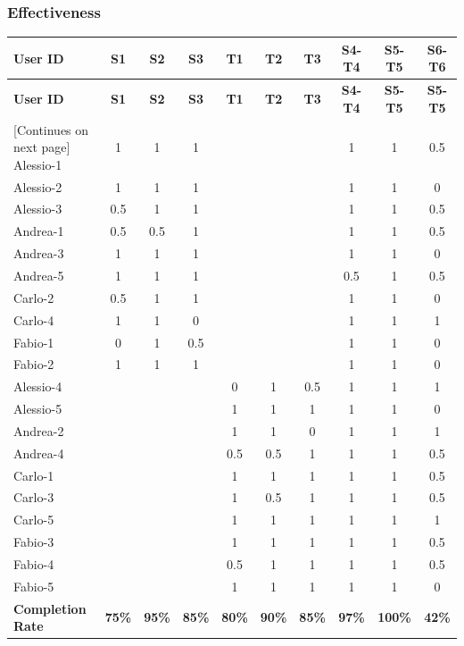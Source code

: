\subsubsection{Effectiveness}
    \begin{tabularx}{\linewidth}{l|c|c|c|c|c|c|c|c|c}
    \toprule
    \textbf{User ID} & \textbf{S1} & \textbf{S2} & \textbf{S3} & \textbf{T1} & \textbf{T2} & \textbf{T3} & \textbf{S4-T4} & \textbf{S5-T5} & \textbf{S6-T6} \\
    \midrule
    \endfirsthead
    \toprule
    \textbf{User ID} & \textbf{S1} & \textbf{S2} & \textbf{S3} & \textbf{T1} & \textbf{T2} & \textbf{T3} & \textbf{S4-T4} & \textbf{S5-T5} & \textbf{S5-T5} \\
    \midrule
    \endhead
    \midrule
    \footnotesize [Continues on next page]
    \endfoot
    \bottomrule
    \endlastfoot
        Alessio-1 & 1 & 1 & 1 &  &  &  & 1 & 1 & 0.5 \\ \midrule
        Alessio-2 & 1 & 1 & 1 &  &  &  & 1 & 1 & 0 \\ \midrule
        Alessio-3 & 0.5 & 1 & 1 &  &  &  & 1 & 1 & 0.5 \\ \midrule
        Andrea-1 & 0.5 & 0.5 & 1 &  &  &  & 1 & 1 & 0.5 \\ \midrule
        Andrea-3 & 1 & 1 & 1 &  &  &  & 1 & 1 & 0 \\ \midrule
        Andrea-5 & 1 & 1 & 1 &  &  &  & 0.5 & 1 & 0.5 \\ \midrule
        Carlo-2 & 0.5 & 1 & 1 &  &  &  & 1 & 1 & 0 \\ \midrule
        Carlo-4 & 1 & 1 & 0 &  &  &  & 1 & 1 & 1 \\ \midrule
        Fabio-1 & 0 & 1 & 0.5 &  &  &  & 1 & 1 & 0 \\ \midrule
        Fabio-2 & 1 & 1 & 1 &  &  &  & 1 & 1 & 0 \\ \midrule
        Alessio-4 &  &  &  & 0 & 1 & 0.5 & 1 & 1 & 1 \\ \midrule
        Alessio-5 &  &  &  & 1 & 1 & 1 & 1 & 1 & 0 \\ \midrule
        Andrea-2 &  &  &  & 1 & 1 & 0 & 1 & 1 & 1 \\ \midrule
        Andrea-4 &  &  &  & 0.5 & 0.5 & 1 & 1 & 1 & 0.5 \\ \midrule
        Carlo-1 &  &  &  & 1 & 1 & 1 & 1 & 1 & 0.5 \\ \midrule
        Carlo-3 &  &  &  & 1 & 0.5 & 1 & 1 & 1 & 0.5 \\ \midrule
        Carlo-5 &  &  &  & 1 & 1 & 1 & 1 & 1 & 1 \\ \midrule
        Fabio-3 &  &  &  & 1 & 1 & 1 & 1 & 1 & 0.5 \\ \midrule
        Fabio-4 &  &  &  & 0.5 & 1 & 1 & 1 & 1 & 0.5 \\ \midrule
        Fabio-5 &  &  &  & 1 & 1 & 1 & 1 & 1 & 0 \\ \midrule
        \textbf{Completion Rate} & \textbf{75\%} & \textbf{95\%} & \textbf{85\%} & \textbf{80\%} & \textbf{90\%} & \textbf{85\%} & \textbf{97\%} & \textbf{100\%} & \textbf{42\%}
    \end{tabularx}

